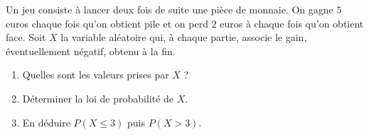 \documentclass[11pt]{article}
\begin{document}
\begin{app}
  Un jeu consiste à lancer deux fois de suite une pièce de monnaie. On gagne $5$
  euros chaque fois qu'on obtient pile et on perd $2$ euros à chaque fois qu'on
  obtient face. Soit $X$ la variable aléatoire qui, à chaque partie, associe le
  gain, éventuellement négatif, obtenu à la fin.
  \begin{enumerate}
    \item Quelles sont les valeurs prises par $X$ ?
    \item Déterminer la loi de probabilité de $X$.
    \item En déduire $P\left( X\leq3 \right)$ puis $P\left( X>3 \right)$.
  \end{enumerate}
\end{app}
\end{document}
